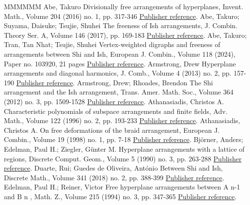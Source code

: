\documentclass[11pt]{article}
\theoremstyle{definition}
\numberwithin{equation}{section}
\begin{document}
\begin{thebibliography}{MMMMMM}
 Abe, Takuro Divisionally free arrangements of hyperplanes, Invent. Math., Volume 204 (2016) no. 1, pp. 317-346 \href{https://alco.centre-mersenne.org/articles/10.5802/alco.405/#Abe16}{Publisher reference}.
 Abe, Takuro; Suyama, Daisuke; Tsujie, Shuhei The freeness of Ish arrangements, J. Combin. Theory Ser. A, Volume 146 (2017), pp. 169-183 \href{https://alco.centre-mersenne.org/articles/10.5802/alco.405/#AST17}{Publisher reference}.
 Abe, Takuro; Tran, Tan Nhat; Tsujie, Shuhei Vertex-weighted digraphs and freeness of arrangements between Shi and Ish, European J. Combin., Volume 118 (2024), Paper no. 103920, 21 pages \href{https://alco.centre-mersenne.org/articles/10.5802/alco.405/#ATT24}{Publisher reference}.
 Armstrong, Drew Hyperplane arrangements and diagonal harmonics, J. Comb., Volume 4 (2013) no. 2, pp. 157-190 \href{https://alco.centre-mersenne.org/articles/10.5802/alco.405/#Arms13}{Publisher reference}.
 Armstrong, Drew; Rhoades, Brendon The Shi arrangement and the Ish arrangement, Trans. Amer. Math. Soc., Volume 364 (2012) no. 3, pp. 1509-1528 \href{https://alco.centre-mersenne.org/articles/10.5802/alco.405/#AR12}{Publisher reference}.
 Athanasiadis, Christos A. Characteristic polynomials of subspace arrangements and finite fields, Adv. Math., Volume 122 (1996) no. 2, pp. 193-233 \href{https://alco.centre-mersenne.org/articles/10.5802/alco.405/#A96}{Publisher reference}.
 Athanasiadis, Christos A. On free deformations of the braid arrangement, European J. Combin., Volume 19 (1998) no. 1, pp. 7-18 \href{https://alco.centre-mersenne.org/articles/10.5802/alco.405/#Atha98}{Publisher reference}.
 Björner, Anders; Edelman, Paul H.; Ziegler, Günter M. Hyperplane arrangements with a lattice of regions, Discrete Comput. Geom., Volume 5 (1990) no. 3, pp. 263-288 \href{https://alco.centre-mersenne.org/articles/10.5802/alco.405/#BEZ90}{Publisher reference}.
 Duarte, Rui; Guedes de Oliveira, António Between Shi and Ish, Discrete Math., Volume 341 (2018) no. 2, pp. 388-399 \href{https://alco.centre-mersenne.org/articles/10.5802/alco.405/#DG18}{Publisher reference}.
 Edelman, Paul H.; Reiner, Victor Free hyperplane arrangements between A n-1  and B n , Math. Z., Volume 215 (1994) no. 3, pp. 347-365 \href{https://alco.centre-mersenne.org/articles/10.5802/alco.405/#ER94}{Publisher reference}.

\end{thebibliography}
\end{document}
